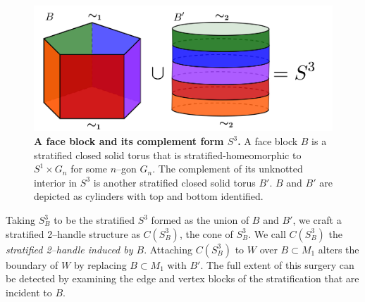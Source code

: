 \begin{figure}[h!]
	\centering
	\includegraphics[width=\textwidth]{figures/face-block-complement.png}
	\caption{
		\textbf{A face block and its complement form $S^3$.}
		A face block $B$ is a stratified closed solid torus that is stratified-homeomorphic to $S^1\times G_n$ for some $n$--gon $G_n$.
		The complement of its unknotted interior in $S^3$ is another stratified closed solid torus $B'$.
		$B$ and $B'$ are depicted as cylinders with top and bottom identified.
	}
	\label{fig:face-block-complement}
\end{figure}

Taking $S_B^3$ to be the stratified $S^3$ formed as the union of $B$ and $B'$, we craft a stratified 2--handle structure as $C(S_B^3)$, the cone of $S_B^3$.
We call $C(S_B^3)$ the \emph{stratified 2--handle induced by $B$}.
Attaching $C(S_B^3)$ to $W$ over $B\subset M_1$ alters the boundary of $W$ by replacing $B\subset M_1$ with $B'$.
The full extent of this surgery can be detected by examining the edge and vertex blocks of the stratification that are incident to $B$.

